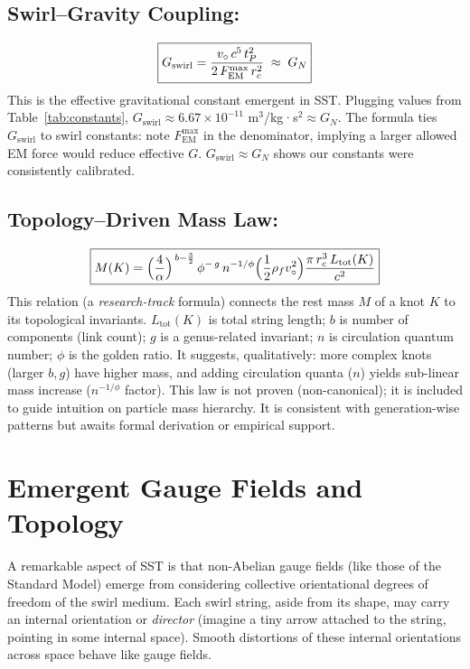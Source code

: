 \documentclass[reprint,aps,onecolumn,nofootinbib]{revtex4-2}
\newcommand{\FmaxEM}{F_{\mathrm{EM}}^{\max}}             %
\begin{document}
        \subsection{Swirl–Gravity Coupling:}
            \[
                \boxed{%
                    G_{\text{swirl}} = \frac{v_{\circ}\,c^5\,t_P^2}{2\,\FmaxEM\,r_c^2}
                    \;\approx\; G_N
                }
            \]
            This is the effective gravitational constant emergent in SST. Plugging values from Table~\ref{tab:constants}, $G_{\text{swirl}}\approx 6.67\times10^{-11}$ m$^3$/kg·s$^2 \approx G_N$. The formula ties $G_{\text{swirl}}$ to swirl constants: note $\FmaxEM$ in the denominator, implying a larger allowed EM force would reduce effective $G$. $G_{\text{swirl}}\approx G_N$ shows our constants were consistently calibrated.

        \subsection{Topology–Driven Mass Law:}
            \[
                \boxed{%
                    M (K) = \Big(\frac{4}{\alpha}\Big)^{\,b-\frac{3}{2}}\,\phi^{-\,g}\,n^{-1/\phi}
                    \Big(\frac{1}{2}\rho_f v_{\circ}^2\Big)
                    \frac{\pi\,r_c^3\,L_{\text{tot}}(K)}{c^2}
                }
            \]
            This relation (a \emph{research-track} formula) connects the rest mass $M$ of a knot $K$ to its topological invariants. $L_{\text{tot}}(K)$ is total string length; $b$ is number of components (link count); $g$ is a genus-related invariant; $n$ is circulation quantum number; $\phi$ is the golden ratio. It suggests, qualitatively: more complex knots (larger $b,g$) have higher mass, and adding circulation quanta ($n$) yields sub-linear mass increase ($n^{-1/\phi}$ factor). This law is not proven (non-canonical); it is included to guide intuition on particle mass hierarchy. It is consistent with generation-wise patterns but awaits formal derivation or empirical support.


    \section{Emergent Gauge Fields and Topology}
	A remarkable aspect of SST is that non-Abelian gauge fields (like those of the Standard Model) emerge from considering collective orientational degrees of freedom of the swirl medium. Each swirl string, aside from its shape, may carry an internal orientation or \emph{director} (imagine a tiny arrow attached to the string, pointing in some internal space). Smooth distortions of these internal orientations across space behave like gauge fields.
\end{document}
